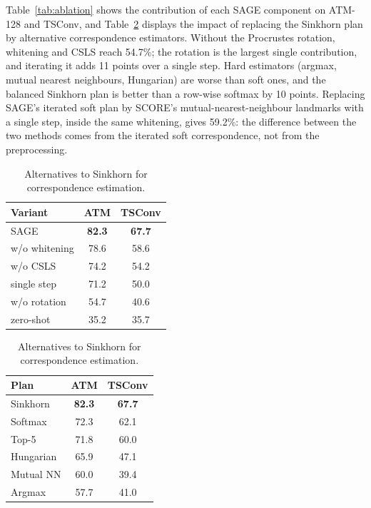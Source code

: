 \documentclass[10pt,twocolumn,letterpaper]{article}
\begin{document}
Table~\ref{tab:ablation} shows the contribution of each SAGE component on ATM-128 and TSConv, and Table~\ref{tab:plan} displays the impact of replacing the Sinkhorn plan by alternative correspondence estimators. Without the Procrustes rotation, whitening and CSLS reach 54.7\%; the rotation is the largest single contribution, and iterating it adds 11 points over a single step. Hard estimators (argmax, mutual nearest neighbours, Hungarian) are worse than soft ones, and the balanced Sinkhorn plan is better than a row-wise softmax by 10 points. Replacing SAGE's iterated soft plan by SCORE's mutual-nearest-neighbour landmarks with a single step, inside the same whitening, gives 59.2\%: the difference between the two methods comes from the iterated soft correspondence, not from the preprocessing.

\begin{table}[t]
\centering
\small
\setlength{\tabcolsep}{4pt}
\begin{minipage}[t]{0.52\columnwidth}
\centering
\caption{Ablation study of each SAGE component (top-1, seed 3300).}
\label{tab:ablation}
\begin{tabular}{@{}lcc@{}}
\toprule
Variant & ATM & TSConv \\ \midrule
SAGE & \textbf{82.3} & \textbf{67.7} \\
w/o whitening & 78.6 & 58.6 \\
w/o CSLS & 74.2 & 54.2 \\
single step & 71.2 & 50.0 \\
w/o rotation & 54.7 & 40.6 \\
zero-shot & 35.2 & 35.7 \\ \bottomrule
\end{tabular}
\end{minipage}\hfill
\begin{minipage}[t]{0.45\columnwidth}
\centering
\caption{Alternatives to Sinkhorn for correspondence estimation.}
\label{tab:plan}
\begin{tabular}{@{}lcc@{}}
\toprule
Plan & ATM & TSConv \\ \midrule
Sinkhorn & \textbf{82.3} & \textbf{67.7} \\
Softmax & 72.3 & 62.1 \\
Top-5 & 71.8 & 60.0 \\
Hungarian & 65.9 & 47.1 \\
Mutual NN & 60.0 & 39.4 \\
Argmax & 57.7 & 41.0 \\ \bottomrule
\end{tabular}
\end{minipage}
\end{table}
\end{document}
